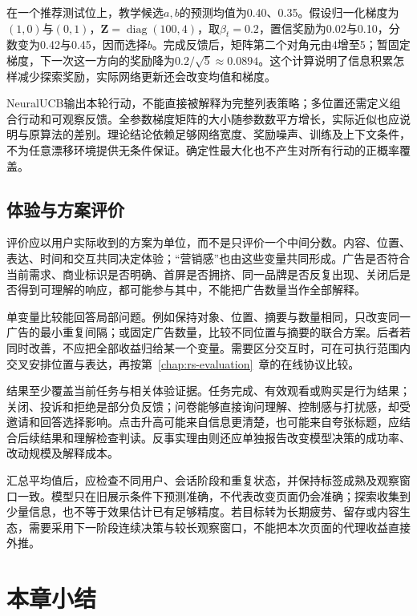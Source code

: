 在一个推荐测试位上，教学候选$a,b$的预测均值为0.40、0.35。假设归一化梯度为$(1,0)$与$(0,1)$，$\bm Z=\operatorname{diag}(100,4)$，取$\beta_t=0.2$，置信奖励为0.02与0.10，分数变为0.42与0.45，因而选择$b$。完成反馈后，矩阵第二个对角元由4增至5；暂固定梯度，下一次这一方向的奖励降为$0.2/\sqrt5\approx0.0894$。这个计算说明了信息积累怎样减少探索奖励，实际网络更新还会改变均值和梯度。

NeuralUCB输出本轮行动，不能直接被解释为完整列表策略；多位置还需定义组合行动和可观察反馈。全参数梯度矩阵的大小随参数数平方增长，实际近似也应说明与原算法的差别。理论结论依赖足够网络宽度、奖励噪声、训练及上下文条件，不为任意漂移环境提供无条件保证。确定性最大化也不产生对所有行动的正概率覆盖。

\subsection{体验与方案评价}
\label{sec:rs-display-experience}

评价应以用户实际收到的方案为单位，而不是只评价一个中间分数。内容、位置、表达、时间和交互共同决定体验；“营销感”也由这些变量共同形成。广告是否符合当前需求、商业标识是否明确、首屏是否拥挤、同一品牌是否反复出现、关闭后是否得到可理解的响应，都可能参与其中，不能把广告数量当作全部解释。

单变量比较能回答局部问题。例如保持对象、位置、摘要与数量相同，只改变同一广告的最小重复间隔；或固定广告数量，比较不同位置与摘要的联合方案。后者若同时改善，不应把全部收益归给某一个变量。需要区分交互时，可在可执行范围内交叉安排位置与表达，再按第~\ref{chap:rs-evaluation}~章的在线协议比较。

结果至少覆盖当前任务与相关体验证据。任务完成、有效观看或购买是行为结果；关闭、投诉和拒绝是部分负反馈；问卷能够直接询问理解、控制感与打扰感，却受邀请和回答选择影响。点击升高可能来自信息更清楚，也可能来自夸张标题，应结合后续结果和理解检查判读。反事实理由则还应单独报告改变模型决策的成功率、改动规模及解释成本。

汇总平均值后，应检查不同用户、会话阶段和重复状态，并保持标签成熟及观察窗口一致。模型只在旧展示条件下预测准确，不代表改变页面仍会准确；探索收集到少量信息，也不等于效果估计已有足够精度。若目标转为长期疲劳、留存或内容生态，需要采用下一阶段连续决策与较长观察窗口，不能把本次页面的代理收益直接外推。

\section{本章小结}
\label{sec:rs-presentation-summary}

